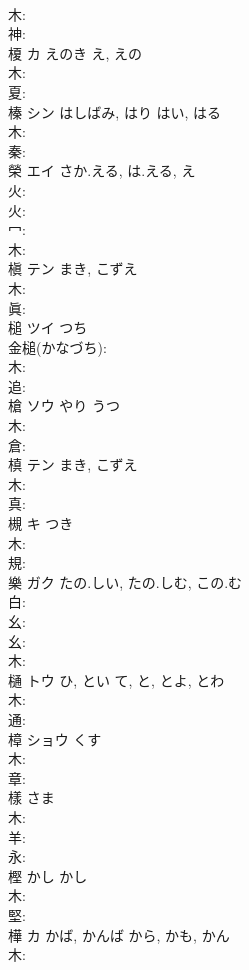\documentclass[8pt]{extreport}
\begin{document}
\begin{CJK}{UTF8}{min}
\\	木: 
\\	神: 
\\	榎	カ	えのき	え, えの	
\\	木: 
\\	夏: 
\\	榛	シン	はしばみ, はり	はい, はる	
\\	木: 
\\	秦: 
\\	榮	エイ	さか.える, は.える, え		
\\	火: 
\\	火: 
\\	冖: 
\\	木: 
\\	槇	テン	まき, こずえ		
\\	木: 
\\	眞: 
\\	槌	ツイ	つち		
\\	金槌(かなづち): 
\\	木: 
\\	追: 
\\	槍	ソウ	やり	うつ	
\\	木: 
\\	倉: 
\\	槙	テン	まき, こずえ		
\\	木: 
\\	真: 
\\	槻	キ	つき		
\\	木: 
\\	規: 
\\	樂	ガク	たの.しい, たの.しむ, この.む		
\\	白: 
\\	幺: 
\\	幺: 
\\	木: 
\\	樋	トウ	ひ, とい	て, と, とよ, とわ	
\\	木: 
\\	通: 
\\	樟	ショウ	くす		
\\	木: 
\\	章: 
\\	樣		さま				
\\	木: 
\\	羊: 
\\	永: 
\\	樫	かし	かし		
\\	木: 
\\	堅: 
\\	樺	カ	かば, かんば	から, かも, かん	
\\	木: 

\end{CJK}
\end{document}
